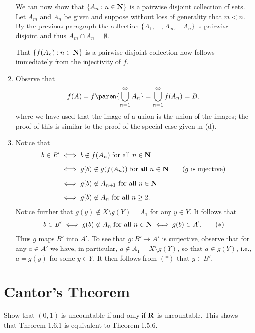 \documentclass{lew98_solutions}
\begin{document}
\begin{solution}
\begin{enumerate}
        We can now show that \( \{ A_n : n \in \mathbf{N} \} \) is a pairwise disjoint collection of sets. Let \( A_m \) and \( A_n \) be given and suppose without loss of generality that \( m < n \). By the previous paragraph the collection \( \{ A_1, \ldots, A_m, \ldots A_n \} \) is pairwise disjoint and thus \( A_m \cap A_n = \emptyset \).
        
        That \( \{ f(A_n) : n \in \mathbf{N} \} \) is a pairwise disjoint collection now follows immediately from the injectivity of \( f \).

        \item Observe that
        \[
            f(A) = f \paren{ \bigcup_{n=1}^{\infty} A_n } = \bigcup_{n=1}^{\infty} f(A_n) = B,
        \]
        where we have used that the image of a union is the union of the images; the proof of this is similar to the proof of the special case given in  (d).

        \item Notice that
        \begin{align*}
            b \in B' & \iff b \not\in f(A_n) \text{ for all } n \in \mathbf{N} \\[2mm]
            & \iff g(b) \not\in g(f(A_n)) \text{ for all } n \in \mathbf{N} \tag{\( g \) is injective} \\[2mm]
            & \iff g(b) \not\in A_{n+1} \text{ for all } n \in \mathbf{N} \\[2mm]
            & \iff g(b) \not\in A_n \text{ for all } n \geq 2.
        \end{align*}
        Notice further that \( g(y) \not\in X \setminus g(Y) = A_1 \) for any \( y \in Y \). It follows that
        \[
            b \in B' \iff g(b) \not\in A_n \text{ for all } n \in \mathbf{N} \iff g(b) \in A'. \tag{\( * \)}
        \]
        Thus \( g \) maps \( B' \) into \( A' \). To see that \( g : B' \to A' \) is surjective, observe that for any \( a \in A' \) we have, in particular, \( a \not\in A_1 = X \setminus g(Y) \), so that \( a \in g(Y) \), i.e., \( a = g(y) \) for some \( y \in Y \). It then follows from \( (*) \) that \( y \in B' \).
    \end{enumerate}
\end{solution}

\section{Cantor's Theorem}
\label{sec:1.6}

\begin{exercise}
\label{ex:1.6.1}
    Show that \( (0, 1) \) is uncountable if and only if \( \mathbf{R} \) is uncountable. This shows that Theorem 1.6.1 is equivalent to Theorem 1.5.6.
\end{exercise}
\end{document}
